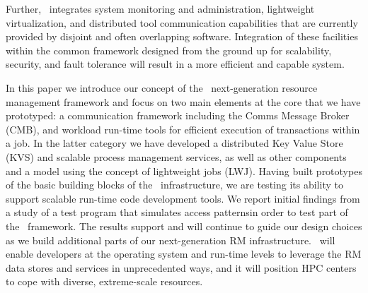 Further, \flux\ integrates system monitoring and
administration, lightweight virtualization, 
and distributed tool communication capabilities 
that are currently provided by disjoint
and often overlapping software. 
Integration of these facilities within the common framework
designed from the ground up for scalability, security,
and fault tolerance will result in a more efficient
and capable system.

In this paper we introduce our concept of the \flux\ next-generation
resource management framework
and focus on two main elements at the core that we have prototyped: a
communication framework including the Comms Message Broker (CMB), and
workload
run-time tools for efficient execution of transactions within a job. In the
latter category we have developed a distributed Key Value Store (KVS) and
scalable process management services, as well as other components and a
model
using the concept of lightweight jobs (LWJ). Having built prototypes of the
basic building blocks of the \flux\ infrastructure, we are testing its
ability to
support scalable run-time code development tools.  We report initial
findings from a study of a test program that simulates
access patternsin order to test part of the \flux\ framework. The results
support and will continue to guide our design choices
as we build additional parts of our next-generation RM infrastructure.
\flux\ will enable developers at the operating system and run-time levels
to leverage the RM data stores and services in unprecedented ways, and it
will
position HPC centers to cope with diverse, extreme-scale resources.

\ifcomments
{}

\ifcomments
{}

\ifcomments
{}

\ifcomments
{}

